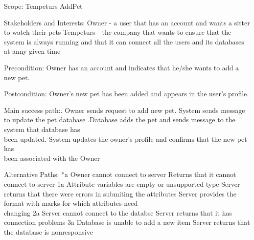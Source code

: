 \documentclass[12pt]{article}
\begin{document}
	Scope: Tempeturs AddPet\newline 

	
	Stakeholders and Interests:\newline 
	Owner - a user that has an account and wants a sitter to watch their pets\newline 
	Tempeturs - the company that wants to ensure that the system is always running and that it can connect all the users and its databases at anny given time\newline
	

	Precondition: Owner has an account and indicates that he/she wants to add a new pet.\newline 

	Postcondition: Owner's new pet has been added and appears in the user's profile.\newline 
	
	Main success path:. Owner sends request to add new pet. System sends message to update the pet database .Database adds the pet and sends message to the system that database has \\ \indent been updated. System updates the owner's profile and confirms that the new pet has \\ \indent been associated with the Owner\newline 
	
	Alternative Paths:\newline
	*a Owner cannot connect to server\newline
	 Returns that it cannot connect to server\newline
	1a Attribute variables are empty or unsupported type\newline
	 Server returns that there were errors in submiting the attributes\newline
	 Server provides the format with marks for which attributes need\\ \indent\indent changing\newline
	2a Server cannot connect to the databse\newline
	 Server returns that it has connection problems\newline
	3a Database is unable to add a new item\newline
	 Server returns that the database is nonresponsive\newline
	
\end{document}
